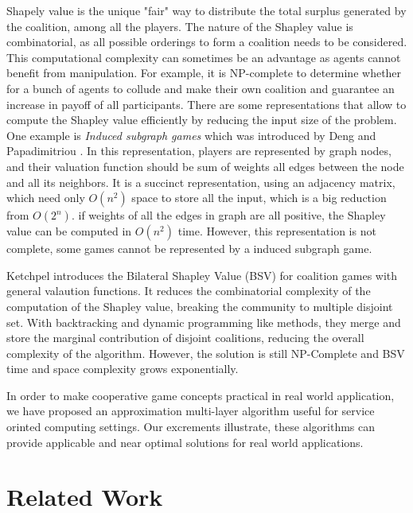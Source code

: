         Shapely value is the unique "fair" way to distribute the total surplus generated by the coalition, among all the players.
        The nature of the Shapley value is combinatorial, as all possible orderings to form a
        coalition needs to be considered. This computational complexity can sometimes be
        an advantage as agents cannot benefit from manipulation. For example, it is NP-complete
        to determine whether for a bunch of agents to collude and make their own coalition and guarantee
        an increase in payoff of all participants\cite{conf/aaai/YokooCSOI05}.
        There are some representations that allow to compute the Shapley value efficiently by reducing the input size of the problem.
        One example is \emph{Induced subgraph games}
        which was introduced by Deng and Papadimitriou \cite{Deng94}. In this representation, players are represented by graph nodes, and
        their valuation function should be sum of weights all edges between the node and all its neighbors. It is a succinct representation, using
        an adjacency matrix, which need only $O(n^2)$ space to store all the input, which is a big reduction from $O(2^n)$.
        if weights of all the edges in graph are all positive, the Shapley value can be computed in $O(n^2)$ time.
        However, this representation is not complete, some games cannot be represented by a induced subgraph game\cite{conf/aaai/YokooCSOI05}.

        Ketchpel introduces the Bilateral Shapley Value (BSV)\cite{conf/aaai/Ketchpel94a} for coalition games with general valaution functions.
        It reduces the combinatorial complexity of the computation of the Shapley value, breaking the community to multiple disjoint set.
        With backtracking and dynamic programming like methods, they merge and store the marginal contribution of disjoint coalitions,
        reducing the overall complexity of the algorithm. However, the solution is still NP-Complete and BSV time and space complexity grows exponentially.

        In order to make cooperative game concepts practical in real world application, we have proposed an approximation multi-layer
        algorithm useful for service orinted computing settings. Our excrements illustrate, these algorithms can provide
        applicable and near optimal solutions for real world applications.


    \section{Related Work}\label{sec:BRRelatedWork}

